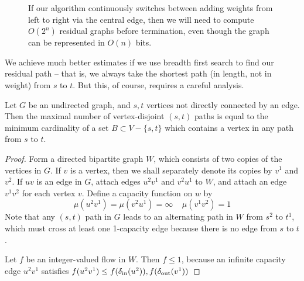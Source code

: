 \begin{figure}
\begin{center}
\end{center}
\caption{If our algorithm continuously switches between adding weights from left to right via the central edge, then we will need to compute $O(2^n)$ residual graphs before termination, even though the graph can be represented in $O(n)$ bits.}
\end{figure}

We achieve much better estimates if we use breadth first search to find our residual path -- that is, we always take the shortest path (in length, not in weight) from $s$ to $t$. But this, of course, requires a careful analysis.

\begin{theorem}[Mader]
    Let $G$ be an undirected graph, and $s,t$ vertices not directly connected by an edge. Then the maximal number of vertex-disjoint $(s,t)$ paths is equal to the minimum cardinality of a set $B \subset V - \{ s, t \}$ which contains a vertex in any path from $s$ to $t$.
\end{theorem}
\begin{proof}
    Form a directed bipartite graph $W$, which consists of two copies of the vertices in $G$. If $v$ is a vertex, then we shall separately denote its copies by $v^1$ and $v^2$. If $uv$ is an edge in $G$, attach edges $u^2v^1$ and $v^2u^1$ to $W$, and attach an edge $v^1v^2$ for each vertex $v$. Define a capacity function on $w$ by
    \[ \mu(u^2v^1) = \mu(v^2u^1) = \infty\ \ \ \ \ \mu(v^1v^2) = 1 \]
    Note that any $(s,t)$ path in $G$ leads to an alternating path in $W$ from $s^2$ to $t^1$, which must cross at least one 1-capacity edge because there is no edge from $s$ to $t$.

    Let $f$ be an integer-valued flow in $W$. Then $f \leq 1$, because an infinite capacity edge $u^2 v^1$ satisfies $f(u^2 v^1) \leq f(\operatorname{\delta_{\text{in}}}(u^2)), f(\operatorname{\delta_{\text{out}}}(v^1))$
\end{proof}


